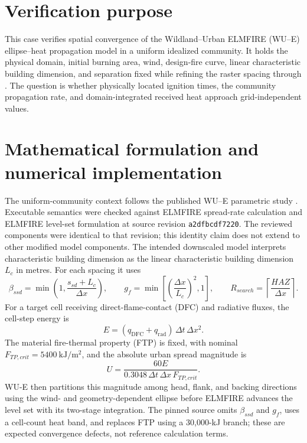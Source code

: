 \section{Verification purpose}

This case verifies spatial convergence of the Wildland--Urban ELMFIRE (WU--E) ellipse--heat propagation model in a uniform idealized community. It holds the physical domain, initial burning area, wind, design-fire curve, linear characteristic building dimension, and separation fixed while refining the raster spacing through \GridSet. The question is whether physically located ignition times, the community propagation rate, and domain-integrated received heat approach grid-independent values.

\ReportOverview

\section{Mathematical formulation and numerical implementation}
The uniform-community context follows the published WU--E parametric study
\cite{PurnomoIJWF2024}. Executable semantics were checked
against ELMFIRE spread-rate calculation and
ELMFIRE level-set formulation at source revision
\texttt{a2dfbcdf7220}.  The reviewed components were identical to that revision; this identity claim
does not extend to other modified model components.
The intended downscaled model interprets characteristic building dimension as the linear
characteristic building dimension $L_c$ in metres. For each spacing it uses
\begin{equation}
 \beta_{ssd}=\min\!\left(1,\frac{s_{sd}+L_c}{\Delta x}\right),\qquad
 g_f=\min\!\left[\left(\frac{\Delta x}{L_c}\right)^2,1\right],\qquad
 R_{search}=\left\lceil\frac{HAZ}{\Delta x}\right\rceil .
\end{equation}
For a target cell receiving direct-flame-contact (DFC) and radiative fluxes, the cell-step energy is
\begin{equation}
 E=(q_{\mathrm{DFC}}+q_{\mathrm{rad}})\,\Delta t\,\Delta x^2.
\end{equation}
The material fire-thermal property (FTP) is fixed, with nominal
$F_{TP,crit}=5400~\si{\kilo\joule\per\square\metre}$, and the absolute urban spread magnitude is
\begin{equation}
 U=\frac{60E}{0.3048\,\Delta t\,\Delta x\,F_{TP,crit}}.
\end{equation}
WU-E then partitions this magnitude among head, flank, and backing directions
using the wind- and geometry-dependent ellipse before ELMFIRE advances the
level set with its two-stage integration. The pinned source omits
$\beta_{ssd}$ and $g_f$, uses a cell-count heat band, and replaces FTP using a
30,000-kJ branch; these are expected convergence defects, not reference calculation terms.

